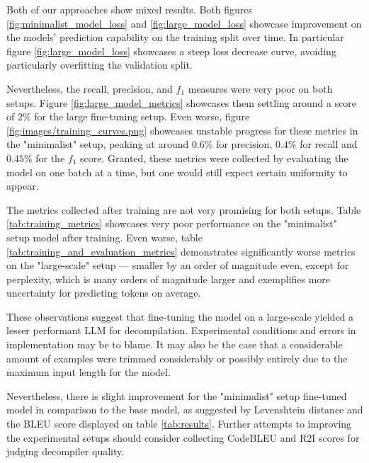 \documentclass[../main.tex]{subfiles}
\begin{document}
Both of our approaches show mixed results. Both figures \ref{fig:minimalist_model_loss}
and \ref{fig:large_model_loss} showcase improvement on the models' prediction 
capability on the training split over time. In particular figure \ref{fig:large_model_loss}
showcases a steep loss decrease curve, avoiding particularly overfitting the validation
split.

Nevertheless, the recall, precision, and $f_1$ measures were very poor on both setups. 
Figure \ref{fig:large_model_metrics} showcases them settling around a score of $2\%$
for the large fine-tuning setup. Even worse, figure \ref{fig:images/training_curves.png}
showcases unstable progress for these metrics in the "minimalist" setup, peaking 
at around $0.6\%$ for precision, $0.4\%$ for recall and $0.45\%$ for the $f_1$ 
score. Granted, these metrics were collected by evaluating the model on one batch
at a time, but one would still expect certain uniformity to appear.

The metrics collected after training are not very promising for both setups. Table
\ref{tab:training_metrics} showcases very poor performance on the "minimalist" setup
model after training. Even worse, table \ref{tab:training_and_evaluation_metrics} 
demonstrates significantly worse metrics on the "large-scale" setup — smaller by
an order of magnitude even, except for perplexity, which is many orders of magnitude
larger and exemplifies more uncertainty for predicting tokens on average.

These observations suggest that fine-tuning the model on a large-scale yielded a
lesser performant LLM for decompilation. Experimental conditions and errors in 
implementation may be to blame. It may also be the case that a considerable amount
of examples were trimmed considerably or possibly entirely due to the maximum input
length for the model.

Nevertheless, there is slight improvement for the "minimalist" setup fine-tuned 
model in comparison to the base model, as suggested by Levenshtein distance and
the BLEU score displayed on table \ref{tab:results}. Further attempts to improving
the experimental setups should consider collecting CodeBLEU \cite{ren2020codebleumethodautomaticevaluation}
and R2I \cite{eom_r2i_2024} scores for judging decompiler quality.
\end{document}
